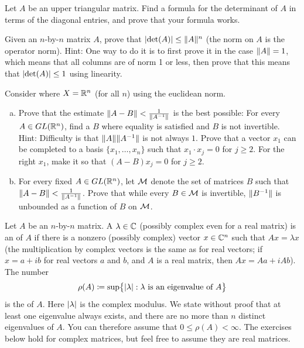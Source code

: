 \begin{exercise}
Let $A$ be an upper triangular matrix.  Find a formula for the determinant
of $A$ in terms of the diagonal entries, and prove that your formula works.
\end{exercise}

\begin{exercise}
Given an $n$-by-$n$ matrix $A$, prove that
$\lvert {\det(A)} \rvert \leq \lVert {A} \rVert^n$ (the norm on $A$ is the operator norm).
Hint: One way to do it is to first prove it in the case $\lVert {A} \rVert=1$, which
means that all columns are of norm 1 or less, then prove that this means
that $\lvert {\det(A)} \rvert \leq 1$ using linearity.
\end{exercise}

\begin{exercise}
Consider 
where $X={\mathbb{R}}^n$ (for all $n$) using the euclidean norm.
\begin{enumerate}[a)]
\item
Prove that the estimate $\lVert {A-B} \rVert < \frac{1}{\lVert {A^{-1}} \rVert}$ is the
best possible:
For every 
$A \in GL({\mathbb{R}}^n)$,
find a $B$ where equality is satisfied and $B$ is not invertible.
Hint:
Difficulty is that $\lVert {A} \rVert\lVert {A^{-1}} \rVert$ is not always $1$.
Prove that a vector $x_1$ can be completed to a basis
$\{ x_1,\ldots,x_n \}$ such that $x_1 \cdot x_j = 0$ for $j \geq 2$.
For the right $x_1$,
make it so that $(A-B)x_j = 0$ for $j \geq 2$.
\item
For every fixed $A \in GL({\mathbb{R}}^n)$,
let ${\mathcal{M}}$ denote the set of matrices
$B$ such that
$\lVert {A-B} \rVert < \frac{1}{\lVert {A^{-1}} \rVert}$.
Prove that while every $B \in {\mathcal{M}}$ is 
invertible, $\lVert {B^{-1}} \rVert$ is unbounded
as a function of $B$ on ${\mathcal{M}}$.
\end{enumerate}
\end{exercise}

\begin{exnote}
Let $A$ be an $n$-by-$n$ matrix.
A $\lambda \in {\mathbb{C}}$ (possibly complex even for a real matrix)
is an \emph{} of $A$
if there is a nonzero (possibly complex) vector $x \in {\mathbb{C}}^n$ such that
$Ax = \lambda x$
(the multiplication by complex vectors is the same as for real vectors;
if $x = a+ib$ for real vectors $a$ and $b$, and $A$ is a real matrix, then $Ax = Aa + i Ab$).
The number
\begin{equation*}
\rho(A) \coloneqq
\sup \bigl\{ \left\lvert {\lambda} \right\rvert : \lambda \text{ is an eigenvalue of } A \bigr\}
\end{equation*}
is the \emph{} of $A$.  Here $\left\lvert {\lambda} \right\rvert$ is the complex
modulus.  We state without proof that at least one eigenvalue always exists,
and there are no more than $n$ distinct eigenvalues of $A$.  You can
therefore assume that $0 \leq \rho(A) < \infty$.
The exercises below hold for complex matrices, but feel free to assume they
are real matrices.
\end{exnote}

